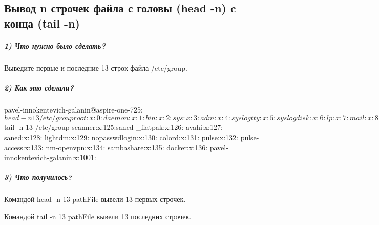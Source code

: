 \subsection{Вывод n строчек файла с  головы (head -n) c конца (tail -n)}

\subparagraph{1) Что нужно было сделать?}

Выведите первые и последние 13 строк файла /etc\-/group.

\subparagraph{2) Как это сделали?}

\begin{MyVerbatimCode}[label=Debian terminal]
pavel-innokentevich-galanin@aspire-one-725:~$ head -n 13 /etc/group
root:x:0:
daemon:x:1:
bin:x:2:
sys:x:3:
adm:x:4:syslog
tty:x:5:syslog
disk:x:6:
lp:x:7:
mail:x:8:
news:x:9:
uucp:x:10:
man:x:12:
proxy:x:13:
pavel-innokentevich-galanin@aspire-one-725:~$ tail -n 13 /etc/group
scanner:x:125:saned
_flatpak:x:126:
avahi:x:127:
saned:x:128:
lightdm:x:129:
nopasswdlogin:x:130:
colord:x:131:
pulse:x:132:
pulse-access:x:133:
nm-openvpn:x:134:
sambashare:x:135:
docker:x:136:
pavel-innokentevich-galanin:x:1001:
\end{MyVerbatimCode}

\subparagraph{3) Что получилось?}

Командой head -n 13 pathFile вывели 13 первых строчек.

Командой tail -n 13 pathFile вывели 13 последних строчек.
